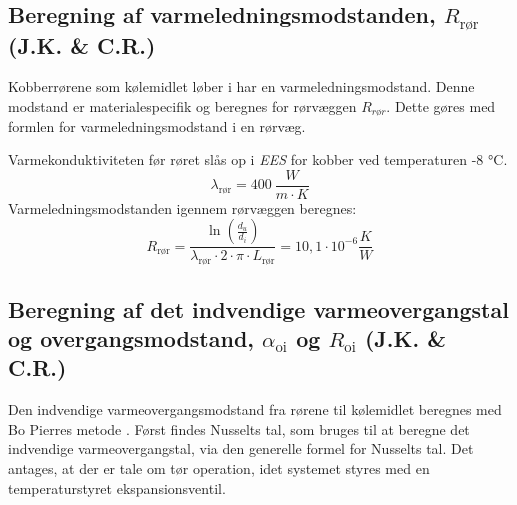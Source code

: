 \documentclass[../Hovedrapport.tex]{subfiles}
\begin{document}

\subsection{Beregning af varmeledningsmodstanden, $R_\text{rør}$  (J.K. \& C.R.)}
    \label{sec:Varmeledningsmodstand}

Kobberrørene som kølemidlet løber i har en varmeledningsmodstand. Denne modstand er materialespecifik og beregnes for rørvæggen ${R_{\textit{rør}}}$. Dette gøres med formlen for varmeledningsmodstand i en rørvæg.

Varmekonduktiviteten før røret slås op i \textit{EES} for kobber ved temperaturen -8 $\si{\celsius}$.
\begin{equation}
\lambda_\text{rør} = \SI{400}{\frac{W}{m \cdot K}}
\end{equation}
Varmeledningsmodstanden igennem rørvæggen beregnes:
\begin{equation}
R_\text{rør} = \frac {\ln{ \left( \frac{d_{u}}{d_{i}} \right) }}{  \lambda_{\text{rør}} \cdot  2 \cdot  \pi \cdot  L_{\text{rør}}} =10,1\cdot 10^{-6}\si{\frac{K}{W}}
\end{equation}




\subsection{Beregning af det indvendige varmeovergangstal og overgangsmodstand, $\alpha_\text{oi}$ og $R_\text{oi}$  (J.K. \& C.R.)}
    \label{sec:Indvendig varmeovergangsmodstand}

Den indvendige varmeovergangsmodstand fra rørene til kølemidlet beregnes med Bo Pierres metode \citep{koleteknik}. Først findes Nusselts tal, som bruges til at beregne det indvendige varmeovergangstal, via den generelle formel for Nusselts tal. Det antages, at der er tale om tør operation, idet systemet styres med en temperaturstyret ekspansionsventil. 
\end{document}
